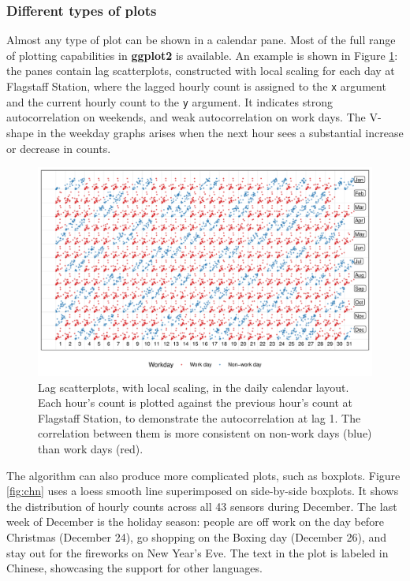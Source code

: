 \documentclass[12pt]{article}
\begin{document}
\hypertarget{different-types-of-plots}{%
\subsubsection{Different types of plots}\label{different-types-of-plots}}

Almost any type of plot can be shown in a calendar pane. Most of the full range of plotting capabilities in \textbf{ggplot2} is available. An example is shown in Figure \ref{fig:scatterplot}: the panes contain lag scatterplots, constructed with local scaling for each day at Flagstaff Station, where the lagged hourly count is assigned to the \texttt{x} argument and the current hourly count to the \texttt{y} argument. It indicates strong autocorrelation on weekends, and weak autocorrelation on work days. The V-shape in the weekday graphs arises when the next hour sees a substantial increase or decrease in counts.

\begin{figure}

{\centering \includegraphics[width=0.75\linewidth]{figure/scatterplot-1} 

}

\caption{Lag scatterplots, with local scaling, in the daily calendar layout. Each hour's count is plotted against the previous hour's count at Flagstaff Station, to demonstrate the autocorrelation at lag 1. The correlation between them is more consistent on non-work days (blue) than work days (red).}\label{fig:scatterplot}
\end{figure}



The algorithm can also produce more complicated plots, such as boxplots. Figure \ref{fig:chn} uses a loess smooth line \citep{cleveland1979loess} superimposed on side-by-side boxplots. It shows the distribution of hourly counts across all 43 sensors during December. The last week of December is the holiday season: people are off work on the day before Christmas (December 24), go shopping on the Boxing day (December 26), and stay out for the fireworks on New Year's Eve. The text in the plot is labeled in Chinese, showcasing the support for other languages.
\end{document}
